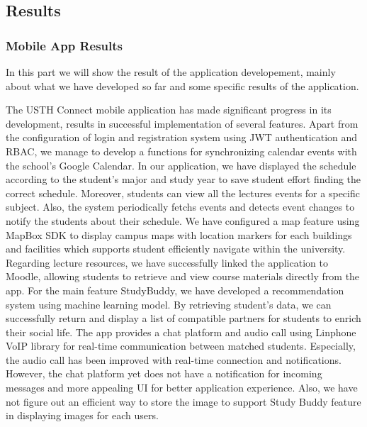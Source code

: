 \documentclass[12pt]{article}
\makeatletter
\newcommand\subsubsubsection{\@startsection{paragraph}{4}{\z@}{-2.5ex\@plus -1ex \@minus -.25ex}{1.25ex \@plus .25ex}{\normalfont\normalsize\bfseries}}
\makeatother
\begin{document}
\subsection{Results}

\subsubsection{Mobile App Results}
In this part we will show the result of the application developement, mainly about what we have developed so far and some specific results of the application.

\subsubsubsection{Application Features Progress}
The USTH Connect mobile application has made significant progress in its development, results in successful implementation of several features.
Apart from the configuration of login and registration system using JWT authentication and RBAC, we manage to develop a functions for synchronizing calendar events with the school's Google Calendar.
In our application, we have displayed the schedule according to the student's major and study year to save student effort finding the correct schedule. 
Moreover, students can view all the lectures events for a specific subject. Also, the system periodically fetchs events and detects event changes to notify the students about their schedule.
We have configured a map feature using MapBox SDK to display campus maps with location markers for each buildings and facilities which supports student efficiently navigate within the university.
Regarding lecture resources, we have successfully linked the application to Moodle, allowing students to retrieve and view course materials directly from the app.
For the main feature StudyBuddy, we have developed a recommendation system using machine learning model. By retrieving student's data, we can successfully return and display a list of compatible partners for students to enrich their social life.
The app provides a chat platform and audio call using Linphone VoIP library for real-time communication between matched students. Especially, the audio call has been improved with real-time connection and notifications. 
However, the chat platform yet does not have a notification for incoming messages and more appealing UI for better application experience.
Also, we have not figure out an efficient way to store the image to support Study Buddy feature in displaying images for each users. 
\end{document}
